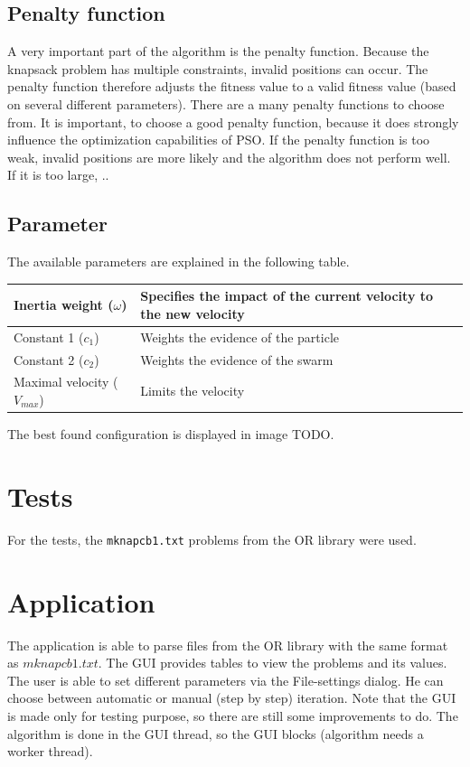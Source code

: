 \documentclass{article}
\begin{document}
\subsection{Penalty function}
A very important part of the algorithm is the penalty function. Because the knapsack problem has multiple constraints, invalid positions can occur. The penalty function therefore adjusts the fitness value to a valid fitness value (based on several different parameters). There are a many penalty functions to choose from. It is important, to choose a good penalty function, because it does strongly influence the optimization capabilities of PSO. If the penalty function is too weak, invalid positions are more likely and the algorithm does not perform well. If it is too large, ..

\subsection{Parameter}
The available parameters are explained in the following table.\\

\begin{tabular}{|l|l|}
	\hline
	Inertia weight ($\omega$) & Specifies the impact of the current velocity to the new velocity \\ \hline
	Constant 1 ($c_1$) & Weights the evidence of the particle \\ \hline
	Constant 2 ($c_2$) & Weights the evidence of the swarm \\ \hline
	Maximal velocity ($V_{max}$) & Limits the velocity \\ \hline
\end{tabular}

The best found configuration is displayed in image TODO.

\section{Tests}
\label{lbl-tests}
For the tests, the \lstinline$mknapcb1.txt$ problems from the OR library were used.

\section{Application}
\label{lbl-app}
The application is able to parse files from the OR library with the same format as $mknapcb1.txt$. The GUI   provides tables to view the problems and its values. The user is able to set different parameters via the File-settings dialog. He can choose between automatic or manual (step by step) iteration. Note that the GUI is made only for testing purpose, so there are still some improvements to do. The algorithm is done in the GUI thread, so the GUI blocks (algorithm needs a worker thread).
\end{document}
